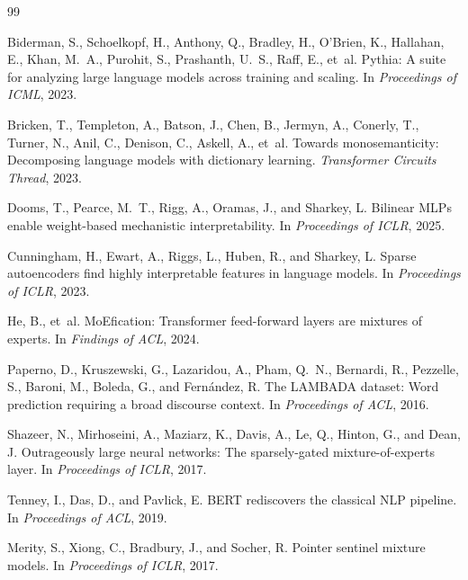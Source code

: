 \documentclass[11pt]{article}
\begin{document}
\begin{thebibliography}{99}

Biderman, S., Schoelkopf, H., Anthony, Q., Bradley, H., O'Brien, K., Hallahan, E., Khan, M.~A., Purohit, S., Prashanth, U.~S., Raff, E., et~al.
\newblock Pythia: A suite for analyzing large language models across training and scaling.
\newblock In \textit{Proceedings of ICML}, 2023.

Bricken, T., Templeton, A., Batson, J., Chen, B., Jermyn, A., Conerly, T., Turner, N., Anil, C., Denison, C., Askell, A., et~al.
\newblock Towards monosemanticity: Decomposing language models with dictionary learning.
\newblock \textit{Transformer Circuits Thread}, 2023.

Dooms, T., Pearce, M.~T., Rigg, A., Oramas, J., and Sharkey, L.
\newblock Bilinear MLPs enable weight-based mechanistic interpretability.
\newblock In \textit{Proceedings of ICLR}, 2025.

Cunningham, H., Ewart, A., Riggs, L., Huben, R., and Sharkey, L.
\newblock Sparse autoencoders find highly interpretable features in language models.
\newblock In \textit{Proceedings of ICLR}, 2023.

He, B., et~al.
\newblock MoEfication: Transformer feed-forward layers are mixtures of experts.
\newblock In \textit{Findings of ACL}, 2024.

Paperno, D., Kruszewski, G., Lazaridou, A., Pham, Q.~N., Bernardi, R., Pezzelle, S., Baroni, M., Boleda, G., and Fernández, R.
\newblock The LAMBADA dataset: Word prediction requiring a broad discourse context.
\newblock In \textit{Proceedings of ACL}, 2016.

Shazeer, N., Mirhoseini, A., Maziarz, K., Davis, A., Le, Q., Hinton, G., and Dean, J.
\newblock Outrageously large neural networks: The sparsely-gated mixture-of-experts layer.
\newblock In \textit{Proceedings of ICLR}, 2017.

Tenney, I., Das, D., and Pavlick, E.
\newblock BERT rediscovers the classical NLP pipeline.
\newblock In \textit{Proceedings of ACL}, 2019.

Merity, S., Xiong, C., Bradbury, J., and Socher, R.
\newblock Pointer sentinel mixture models.
\newblock In \textit{Proceedings of ICLR}, 2017.

\end{thebibliography}
\end{document}
